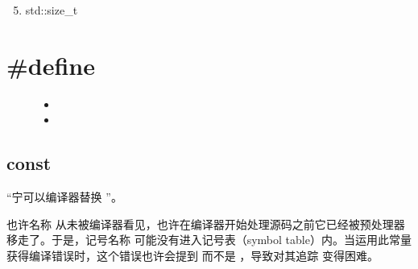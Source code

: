 \documentclass[letterpaper,10pt,english]{sphinxmanual}
\begin{document}
\begin{quote}

\end{quote}
\begin{enumerate}
\setcounter{enumi}{4}
\item {} 
std::size\_t

\end{enumerate}
\begin{quote}

\end{quote}


\section{\#define}
\label{\detokenize{cpp/20_define::doc}}\label{\detokenize{cpp/20_define:define}}\begin{description}
\item[{}] \leavevmode\begin{itemize}
\item {} 

\item {} 

\end{itemize}

\end{description}


\subsection{const}
\label{\detokenize{cpp/20_define:const}}
“宁可以编译器替换  ”。

%
\begin{sphinxVerbatim}[commandchars=\\\{\}]

    
\end{sphinxVerbatim}

也许名称  从未被编译器看见，也许在编译器开始处理源码之前它已经被预处理器移走了。于是，记号名称 
可能没有进入记号表（symbol table）内。当运用此常量获得编译错误时，这个错误也许会提到   而不是  ，导致对其追踪
变得困难。
\end{document}
